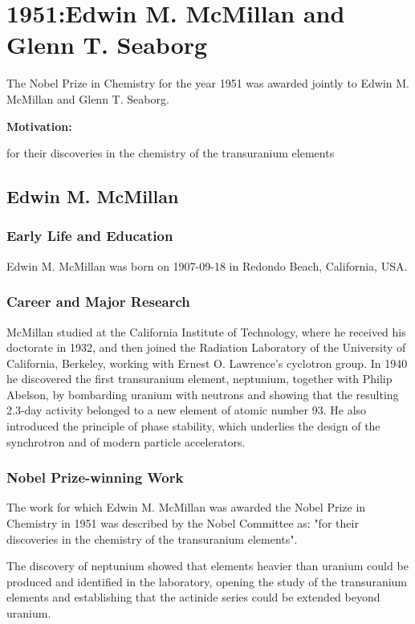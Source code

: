\chapter{1951:Edwin M. McMillan and Glenn T. Seaborg}

\label{chap:chemistry1951}

The Nobel Prize in Chemistry for the year 1951 was awarded jointly to Edwin M. McMillan and Glenn T. Seaborg.

\textbf{Motivation:}

for their discoveries in the chemistry of the transuranium elements

\section{Edwin M. McMillan}

\subsection*{Early Life and Education}

Edwin M. McMillan was born on 1907-09-18 in Redondo Beach, California, USA.

\subsection*{Career and Major Research}

McMillan studied at the California Institute of Technology, where he received his doctorate in 1932, and then joined the Radiation Laboratory of the University of California, Berkeley, working with Ernest O. Lawrence's cyclotron group. In 1940 he discovered the first transuranium element, neptunium, together with Philip Abelson, by bombarding uranium with neutrons and showing that the resulting 2.3-day activity belonged to a new element of atomic number 93. He also introduced the principle of phase stability, which underlies the design of the synchrotron and of modern particle accelerators.

\subsection*{Nobel Prize-winning Work}

The work for which Edwin M. McMillan was awarded the Nobel Prize in Chemistry in 1951 was described by the Nobel Committee as: "for their discoveries in the chemistry of the transuranium elements".

The discovery of neptunium showed that elements heavier than uranium could be produced and identified in the laboratory, opening the study of the transuranium elements and establishing that the actinide series could be extended beyond uranium.

